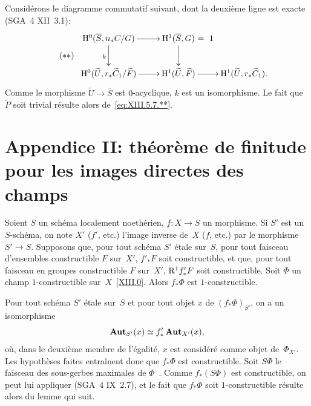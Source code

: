 Consid\'erons le diagramme commutatif suivant, dont la deuxi\`eme
ligne est exacte (SGA~4 XII~3.1):
\begin{equation*}
\label{eq:XIII.5.7.**}
\tag{$**$}
\begin{array}{c}
\xymatrix{{\H^{0}(\overline{S},n_*C/G)}\ar[r]\ar[d]_{k}&{\H^{1}(\overline{S},G)\rlap{$~=~1$}}\ar[d]\\{\H^{0}(\widetilde{U},r_*\widetilde{C}_{1}/\widetilde{F})}\ar[r]&{\H^{1}(\widetilde{U},\widetilde{F})}\ar[r]&{\H^{1}(\widetilde{U},r_*\widetilde{C}_{1}) \rlap{\quoi.}}\\ }
\end{array}
\end{equation*}
Comme le morphisme $\widetilde{U}\to\overline{S}$ est $0$-acyclique,
$k$ est un isomorphisme. Le fait que $\widetilde{P}$ soit trivial
r\'esulte alors de~\eqref{eq:XIII.5.7.**}.

\section[Appendice II: finitude pour les images
directes des champs]{Appendice II: th\'eor\`eme de finitude pour les images
directes des champs}
\label{XIII.6}

\begin{proposition}
\label{XIII.6.1}
Soient $S$ un sch\'ema localement noeth\'erien, $f\colon X\to S$
un morphisme. Si $S'$ est un $S$-sch\'ema, on note $X'$
(\resp $f'$, etc.) l'image inverse de~$X$ (\resp $f$, etc.) par le
morphisme $S'\to S$. Supposons que, pour tout
sch\'ema $S'$ \'etale sur~$S$, pour tout faisceau d'ensembles
constructible $F$ sur~$X'$, $f'_*F$ soit constructible, et que, pour
tout faisceau en groupes constructible $F$ sur~$X'$, $\mathrm{R}^{1}f'_*F$
soit constructible. Soit $\Phi$ un champ $1$-constructible sur~$X$~\eqref{XIII.0}. Alors $f_*\Phi$ est $1$-constructible.
\end{proposition}

Pour tout sch\'ema $S'$ \'etale sur~$S$ et pour tout objet $x$ de
$(f_*\Phi)_{S'}$, on a un isomorphisme
$$
\operatorname{\mathbf{Aut}}_{S'}(x)\simeq f'_*\operatorname{\mathbf{Aut}}_{X'}(x) ,
$$
o\`u, dans le deuxi\`eme membre de l'\'egalit\'e, $x$ est
consid\'er\'e comme objet de~$\Phi_{X'}$. Les hypoth\`eses
faites entra\^inent donc que $f_*\Phi$ est constructible.
Soit $S\Phi$ le faisceau des sous-gerbes maximales de
$\Phi$~\cite[III~2.1.7]{XIII.1}. Comme $f_*(S\Phi)$ est constructible, on
peut lui appliquer (SGA~4 IX~2.7), et le fait que $f_*\Phi$ soit
$1$-constructible r\'esulte alors du lemme qui suit.

